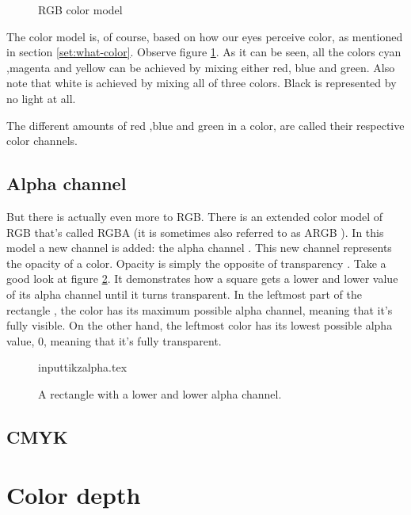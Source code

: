 \begin{refsection}
  \begin{figure}[h]
    \centering
    \caption{RGB color model}
    \label{fig:rgb}
  \end{figure}

  The color model is, of course, based on how our eyes perceive color,
  as mentioned in section \ref{set:what-color}. Observe figure
  \ref{fig:rgb}. As it can be seen, all the colors cyan ,magenta and
  yellow can be achieved by mixing either red, blue and green. Also note
  that white is achieved by mixing all of three colors. Black is
  represented by no light at all.

  The different amounts of red ,blue and green in a color, are called
  their respective color channels.

  \subsection{Alpha channel}
  \label{sec:alpha_chan}

  But there is actually even more to RGB. There is an extended color
  model of RGB that's called RGBA (it is sometimes also
  referred to as ARGB ). In this model a new channel is
  added: the alpha channel . This new channel
  represents the opacity of a color. Opacity is simply the opposite of
  transparency \cite{porter84_compos_dig_img}. Take
  a good look at figure \ref{fig:alpha}. It demonstrates how a square
  gets a lower and lower value of its alpha channel until it turns
  transparent. In the leftmost part of the rectangle , the color has
  its maximum possible alpha channel, meaning that it's fully
  visible. On the other hand, the leftmost color has its lowest
  possible alpha value, $0$, meaning that it's fully transparent.

  \begin{figure}[h!]
    \centering
    inputtikz{alpha.tex}
    \caption{A rectangle with a lower and lower alpha channel.}
    \label{fig:alpha}
  \end{figure}

  \subsection{CMYK}
  \label{sec:cmyk}


  \section{Color depth}
  \label{sec:color-depth}


\end{refsection}
